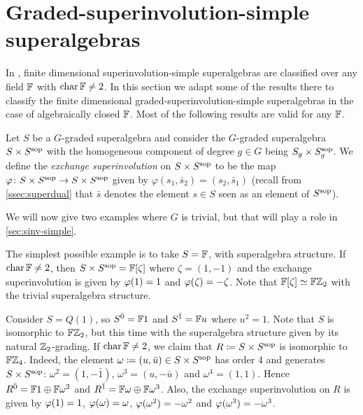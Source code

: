 \section{Graded-superinvolution-simple superalgebras}\label{grd-sinv-simple}

In \cite{racine}, finite dimensional superinvolution-simple superalgebras are classified over any field $\mathbb{F}$ with $\operatorname{char} \mathbb{F} \neq 2$. 
In this section we adapt some of the results there to classify the finite dimensional graded-superinvolution-simple superalgebras in the case of algebraically closed $\mathbb{F}$. 
Most of the following results are valid for any $\mathbb{F}$. 

\begin{defi}\label{def:SxSsop}
	Let $S$ be a $G$-graded superalgebra and consider the $G$-graded superalgebra $S \times S^{\mathrm{sop}}$ with the homogeneous component of degree $g\in G$ being $S_g \times S^{\mathrm{sop}}_g$. 
	We define the \emph{exchange superinvolution} on $S \times S^{\mathrm{sop}}$ to be the map $\varphi\colon S \times S^{\mathrm{sop}} \to S \times S^{\mathrm{sop}}$ given by $\varphi (s_1, \bar s_2) = (s_2, \bar s_1)$ (recall from \cref{ssec:superdual} that $\bar s$ denotes the element $s \in S$ seen as an element of $S^{\mathrm{sop}}$). 
\end{defi}

We will now give two examples where $G$ is trivial, but that will play a role in \cref{sec:sinv-simple}. 

\begin{ex}\label{ex:FxF-iso-FZ2}
	The simplest possible example is to take $S = \mathbb{F}$, with superalgebra structure. 
	If $\operatorname{char} \mathbb{F} \neq 2$, then $S\times S^{\mathrm{sop}} = \mathbb{F} [\zeta]$ where $\zeta = (1, -1)$ and the exchange superinvolution is given by $\varphi(1) = 1$ and $\varphi(\zeta) = -\zeta$.
	Note that $\mathbb{F} [\zeta] \simeq \mathbb{F}\mathbb{Z}_2$ with the trivial superalgebra structure. 
\end{ex}

\begin{ex}\label{ex:FZ2xFZ2sop-iso-FZ4}
	Consider $S = Q(1)$, so $S^{\bar0} = \mathbb{F} 1$ and $S^{\bar1} = \mathbb{F} u$ where $u^2 =1$.
	Note that $S$ is isomorphic to $\mathbb{F}\mathbb{Z}_2$, but this time with the superalgebra structure given by its natural $\mathbb{Z}_2$-grading. 
	If $\operatorname{char} \mathbb{F} \neq 2$, we claim that $R \coloneqq S\times S^{\mathrm{sop}}$ is isomorphic to $\mathbb{F}\mathbb{Z}_4$.
	Indeed, the element $\omega \coloneqq (u, \bar u) \in S\times S^{\mathrm{sop}}$ has order $4$ and generates $S\times S^{\mathrm{sop}}$: $\omega^2 = (1, - \bar 1)$, $\omega^3 = (u, - \bar u)$ and $\omega^4 = (1, 1)$.
	Hence $R^{\bar0} = \mathbb{F}1 \oplus \mathbb{F} \omega^2$ and $R^{\bar1} = \mathbb{F} \omega \oplus \mathbb{F} \omega^3$.
	Also, the exchange superinvolution on $R$ is given by $\varphi(1) = 1$, $\varphi(\omega) = \omega$, $\varphi(\omega^2) = -\omega^2$ and $\varphi(\omega^3) = -\omega^3$.
\end{ex}

